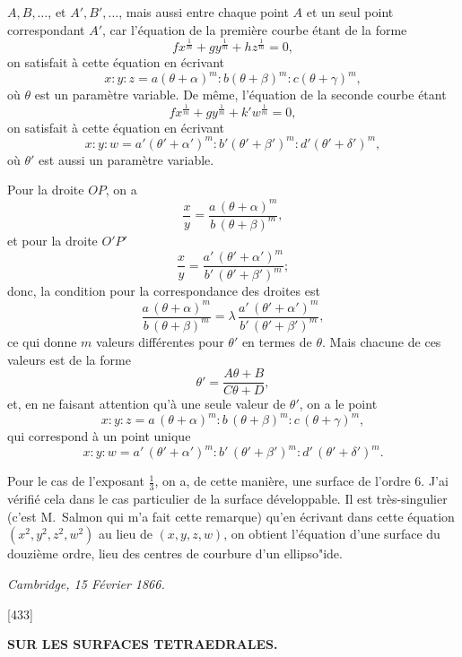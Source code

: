 \documentclass[12pt,a4paper]{article}
\newcommand{\paperref}[1]{\textup{[#1]}}
\theoremstyle{definition}
\begin{document}
\newpage
\setcounter{page}{52}

\noindent
$A, B, \ldots$, et $A', B', \ldots$, mais aussi entre chaque point $A$ et un seul point correspondant $A'$, car l'\'equation de la premi\`ere courbe \'etant de la forme
\[
fx^{\frac{1}{m}} + gy^{\frac{1}{m}} + hz^{\frac{1}{m}} = 0,
\]
on satisfait \`a cette \'equation en \'ecrivant
\[
x : y : z = a(\theta + \alpha)^m : b(\theta + \beta)^m : c(\theta + \gamma)^m,
\]
o\`u $\theta$ est un param\`etre variable. De m\^eme, l'\'equation de la seconde courbe \'etant
\[
fx^{\frac{1}{m}} + gy^{\frac{1}{m}} + k'w^{\frac{1}{m}} = 0,
\]
on satisfait \`a cette \'equation en \'ecrivant
\[
x : y : w = a'(\theta' + \alpha')^m : b'(\theta' + \beta')^m : d'(\theta' + \delta')^m,
\]
o\`u $\theta'$ est aussi un param\`etre variable.

Pour la droite $OP$, on a
\[
\frac{x}{y} = \frac{a\,(\theta + \alpha)^m}{b\,(\theta + \beta)^m},
\]
et pour la droite $O'P'$
\[
\frac{x}{y} = \frac{a'\,(\theta' + \alpha')^m}{b'\,(\theta' + \beta')^m};
\]
donc, la condition pour la correspondance des droites est
\[
\frac{a\,(\theta + \alpha)^m}{b\,(\theta + \beta)^m}
= \lambda\,\frac{a'\,(\theta' + \alpha')^m}{b'\,(\theta' + \beta')^m},
\]
ce qui donne $m$ valeurs diff\'erentes pour $\theta'$ en termes de $\theta$. Mais chacune de ces valeurs est de la forme
\[
\theta' = \frac{A\theta + B}{C\theta + D},
\]
et, en ne faisant attention qu'\`a une seule valeur de $\theta'$, on a le point
\[
x : y : z = a\,(\theta + \alpha)^m : b\,(\theta + \beta)^m : c\,(\theta + \gamma)^m,
\]
qui correspond \`a un point unique
\[
x : y : w = a'\,(\theta' + \alpha')^m : b'\,(\theta' + \beta')^m : d'\,(\theta' + \delta')^m.
\]

Pour le cas de l'exposant $\frac{1}{3}$, on a, de cette mani\`ere, une surface de l'ordre 6. J'ai v\'erifi\'e cela dans le cas particulier de la surface d\'eveloppable. Il est tr\`es-singulier (c'est M.~Salmon qui m'a fait cette remarque) qu'en \'ecrivant dans cette \'equation $(x^2, y^2, z^2, w^2)$ au lieu de $(x, y, z, w)$, on obtient l'\'equation d'une surface du douzi\`eme ordre, lieu des centres de courbure d'un ellipso"ide.

\begin{flushright}
\textit{Cambridge, 15 F\'evrier 1866.}
\end{flushright}

\newpage
\setcounter{page}{53}

\noindent\paperref{433}\quad
\begin{center}
\textbf{SUR LES SURFACES TETRAEDRALES.}
\end{center}
\end{document}
